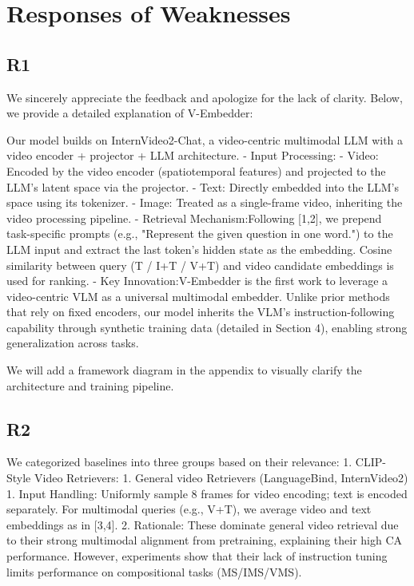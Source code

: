 \documentclass[11pt]{article}
\begin{document}
\section{Responses of Weaknesses}
\subsection{R1}
We sincerely appreciate the feedback and apologize for the lack of clarity. Below, we provide a detailed explanation of V-Embedder:  

Our model builds on InternVideo2-Chat, a video-centric multimodal LLM with a video encoder + projector + LLM architecture.  
- Input Processing:  
  - Video: Encoded by the video encoder (spatiotemporal features) and projected to the LLM's latent space via the projector.  
  - Text: Directly embedded into the LLM's space using its tokenizer.  
  - Image: Treated as a single-frame video, inheriting the video processing pipeline.  
- Retrieval Mechanism:Following [1,2], we prepend task-specific prompts (e.g., "Represent the given question in one word.") to the LLM input and extract the last token's hidden state as the embedding. Cosine similarity between query (T / I+T / V+T) and video candidate embeddings is used for ranking.  
- Key Innovation:V-Embedder is the first work to leverage a video-centric VLM as a universal multimodal embedder. Unlike prior methods that rely on fixed encoders, our model inherits the VLM's instruction-following capability through synthetic training data (detailed in Section 4), enabling strong generalization across tasks.  

We will add a framework diagram in the appendix to visually clarify the architecture and training pipeline.  

\subsection{R2}
We categorized baselines into three groups based on their relevance:  
1. CLIP-Style Video Retrievers:  
  1.  General video Retrievers (LanguageBind, InternVideo2)
    1. Input Handling: Uniformly sample 8 frames for video encoding; text is encoded separately. For multimodal queries (e.g., V+T), we average video and text embeddings as in [3,4].  
    2. Rationale: These dominate general video retrieval due to their strong multimodal alignment from pretraining, explaining their high CA performance. However, experiments show that their lack of instruction tuning limits performance on compositional tasks (MS/IMS/VMS).  
\end{document}
